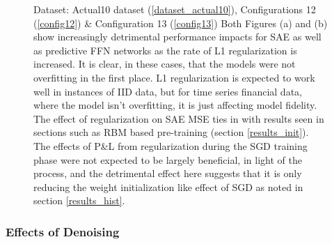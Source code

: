 \documentclass[a4paper,11pt,oneside]{article}
\theoremstyle{plain}
\theoremstyle{definition}
\begin{document}
\begin{figure}[H]
\begin{subfigure}{.5\textwidth}
{				\newline }
			\label{figure-actual_pl_reg}
		\end{subfigure}
		\caption[Effects of L1 Regularization (Actual Data)]{Dataset: Actual10 dataset (\ref{dataset_actual10}),  Configurations 12 (\ref{config12}) \& Configuration 13 (\ref{config13})
			\newline Both Figures (a) and (b) show increasingly detrimental performance impacts for SAE as well as predictive FFN networks as the rate of L1 regularization is increased. It is clear, in these cases, that the models were not overfitting in the first place. L1 regularization is expected to work well in instances of IID data, but for time series financial data, where the model isn't overfitting, it is just affecting model fidelity. The effect of regularization on SAE MSE ties in with results seen in sections such as RBM based pre-training (section \ref{results_init}). The effects of P\&L from regularization during the SGD training phase were not expected to be largely beneficial, in light of the process, and the detrimental effect here suggests that it is only reducing the weight initialization like effect of SGD as noted in section \ref{results_hist}.}
		\label{figure-results-reg}
	\end{figure}
	
	\subsubsection{Effects of Denoising}
	
\end{document}
